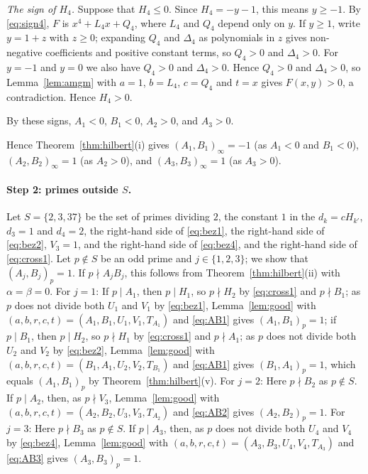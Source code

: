 \documentclass[11pt]{article}
\begin{document}
\emph{The sign of $H_{4}$.} Suppose that $H_{4}\leq0$. Since $H_{4}=-y-1$, this means $y\geq-1$. By \eqref{eq:sign4}, $F$ is $x^4+L_{4}x+Q_{4}$, where $L_{4}$ and $Q_{4}$ depend only on $y$. If $y\geq1$, write $y=1+z$ with $z\geq0$; expanding $Q_{4}$ and $\Delta_{4}$ as polynomials in $z$ gives non-negative coefficients and positive constant terms, so $Q_{4}>0$ and $\Delta_{4}>0$. For $y=-1$ and $y=0$ we also have $Q_{4}>0$ and $\Delta_{4}>0$. Hence $Q_{4}>0$ and $\Delta_{4}>0$, so Lemma~\ref{lem:amgm} with $a=1$, $b=L_{4}$, $c=Q_{4}$ and $t=x$ gives $F(x,y)>0$, a contradiction. Hence $H_{4}>0$.

By these signs, $A_{1}<0$, $B_{1}<0$, $A_{2}>0$, and $A_{3}>0$.

Hence Theorem~\ref{thm:hilbert}(i) gives $(A_{1},B_{1})_\infty=-1$ (as $A_{1}<0$ and $B_{1}<0$), $(A_{2},B_{2})_\infty=1$ (as $A_{2}>0$), and $(A_{3},B_{3})_\infty=1$ (as $A_{3}>0$).

\paragraph{Step 2: primes outside $S$.} Let $S=\{2,3,37\}$ be the set of primes dividing $2$, the constant $1$ in the $d_k=cH_{k'}$, $d_{3}=1$ and $d_{4}=2$, the right-hand side of \eqref{eq:bez1}, the right-hand side of \eqref{eq:bez2}, $V_{3}=1$, and the right-hand side of \eqref{eq:bez4}, and the right-hand side of \eqref{eq:cross1}. Let $p\notin S$ be an odd prime and $j\in\{1,2,3\}$; we show that $(A_j,B_j)_p=1$. If $p\nmid A_jB_j$, this follows from Theorem~\ref{thm:hilbert}(ii) with $\alpha=\beta=0$. For $j=1$: If $p\mid A_{1}$, then $p\mid H_{1}$, so $p\nmid H_{2}$ by \eqref{eq:cross1} and $p\nmid B_{1}$; as $p$ does not divide both $U_{1}$ and $V_{1}$ by \eqref{eq:bez1}, Lemma~\ref{lem:good} with $(a,b,r,c,t)=(A_{1},B_{1},U_{1},V_{1},T_{A_{1}})$ and \eqref{eq:AB1} gives $(A_{1},B_{1})_p=1$; if $p\mid B_{1}$, then $p\mid H_{2}$, so $p\nmid H_{1}$ by \eqref{eq:cross1} and $p\nmid A_{1}$; as $p$ does not divide both $U_{2}$ and $V_{2}$ by \eqref{eq:bez2}, Lemma~\ref{lem:good} with $(a,b,r,c,t)=(B_{1},A_{1},U_{2},V_{2},T_{B_{1}})$ and \eqref{eq:AB1} gives $(B_{1},A_{1})_p=1$, which equals $(A_{1},B_{1})_p$ by Theorem~\ref{thm:hilbert}(v). For $j=2$: Here $p\nmid B_{2}$ as $p\notin S$. If $p\mid A_{2}$, then, as $p\nmid V_{3}$, Lemma~\ref{lem:good} with $(a,b,r,c,t)=(A_{2},B_{2},U_{3},V_{3},T_{A_{2}})$ and \eqref{eq:AB2} gives $(A_{2},B_{2})_p=1$. For $j=3$: Here $p\nmid B_{3}$ as $p\notin S$. If $p\mid A_{3}$, then, as $p$ does not divide both $U_{4}$ and $V_{4}$ by \eqref{eq:bez4}, Lemma~\ref{lem:good} with $(a,b,r,c,t)=(A_{3},B_{3},U_{4},V_{4},T_{A_{3}})$ and \eqref{eq:AB3} gives $(A_{3},B_{3})_p=1$.
\end{document}
